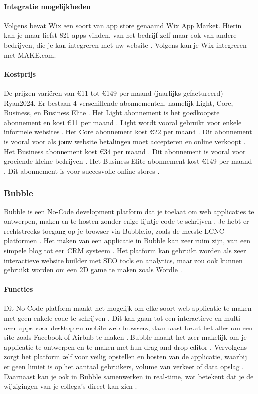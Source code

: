 \paragraph{Integratie mogelijkheden}
Volgens \textcite{Singleton2024} bevat Wix een soort van app store genaamd Wix App Market. 
Hierin kan je maar liefst 821 apps vinden, van het bedrijf zelf maar ook van andere bedrijven, die je kan integreren met uw website \autocite{Singleton2024}.
Volgens \textcite{MAKE.com2024a} kan je Wix integreren met MAKE.com.

\paragraph{Kostprijs}
De prijzen variëren van €11 tot €149 per maand (jaarlijks gefactureerd) \autocite{Wix2024} {Ryan2024}. 
Er bestaan 4 verschillende abonnementen, namelijk Light, Core, Business, en Business Elite \autocite{Wix2024}.
Het Light abonnement is het goedkoopste abonnement en kost €11 per maand \autocite{Wix2024}. Light wordt vooral gebruikt voor enkele informele websites \autocite{Ryan2024}.
Het Core abonnement kost €22 per maand \autocite{Wix2024}. Dit abonnement is vooral voor als jouw website betalingen moet accepteren en online verkoopt \autocite{Ryan2024}.
Het Business abonnement kost €34 per maand \autocite{Wix2024}. Dit abonnement is vooral voor groeiende kleine bedrijven \autocite{Ryan2024}.
Het Business Elite abonnement kost €149 per maand \autocite{Wix2024}. Dit abonnement is voor succesvolle online stores \autocite{Ryan2024}.
\subsubsection*{Bubble}
Bubble is een No-Code development platform dat je toelaat om web applicaties te ontwerpen, maken en te hosten zonder enige lijntje code te schrijven \autocite{Sharma2022}.
Je hebt er rechtstreeks toegang op je browser via Bubble.io, zoals de meeste LCNC platformen \autocite{Minor2022}. Het maken van een applicatie in Bubble kan zeer ruim zijn, van een simpele blog tot een CRM systeem \autocite{Sharma2022}.
Het platform kan gebruikt worden als zeer interactieve website builder met SEO tools en analytics, maar zou ook kunnen gebruikt worden om een 2D game te maken zoals Wordle \autocite{Minor2022}.

\paragraph{Functies}
Dit No-Code platform maakt het mogelijk om elke soort web applicatie te maken met geen enkele code te schrijven \autocite{Bubble2024b}.
Dit kan gaan tot een interactieve en multi-user apps voor desktop en mobile web browsers, daarnaast bevat het alles om een site zoals Facebook of Airbnb te maken \autocite{Bubble2024b}.
Bubble maakt het zeer makelijk om je applicatie te ontwerpen en te maken met hun drag-and-drop editor \autocite{Bubble2024b}.
Vervolgens zorgt het platform zelf voor veilig opstellen en hosten van de applicatie, waarbij er geen limiet is op het aantaal gebruikers, volume van verkeer of data opslag \autocite{Bubble2024b}.
Daarnaast kan je ook in Bubble samenwerken in real-time, wat betekent dat je de wijzigingen van je collega's direct kan zien \autocite{Bubble2024b}.
